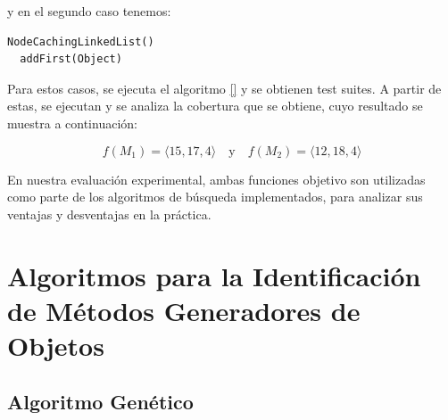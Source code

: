 y en el segundo caso tenemos:

\begin{lstlisting}[numbers=none, caption=Conjunto de métodos \( M_2 \)]
  NodeCachingLinkedList()
  addFirst(Object)
\end{lstlisting}


Para estos casos, se ejecuta el algoritmo \ref{}  y se obtienen test suites.
A partir de estas, se ejecutan y se analiza la cobertura que se obtiene, cuyo
resultado se muestra a continuación:

\[
f(M_1) = \langle 15, 17, 4 \rangle \quad \text{y} \quad f(M_2) = \langle 12, 18, 4 \rangle
\]


En nuestra evaluación experimental, ambas funciones objetivo son utilizadas como
parte de los algoritmos de búsqueda implementados, para analizar sus ventajas y
desventajas en la práctica. 

\section{Algoritmos para la Identificación de Métodos Generadores de Objetos}
\label{sec:algorithms}


\subsection{Algoritmo Genético}
\label{alg:approachGA}

